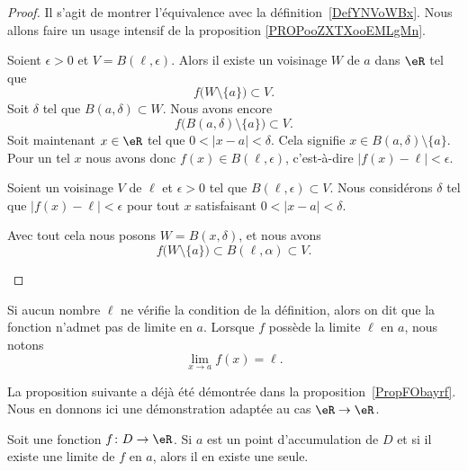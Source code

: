 \begin{proof}
	Il s'agit de montrer l'équivalence avec la définition~\ref{DefYNVoWBx}. Nous allons faire un usage intensif de la proposition \ref{PROPooZXTXooEMLgMn}.
	\begin{subproof}
		Soient \( \epsilon>0\) et \( V=B(\ell,\epsilon)\). Alors il existe un voisinage \( W\) de \( a\) dans \( \eR\) tel que
		\begin{equation}
			f\big( W\setminus\{ a \} \big)\subset V.
		\end{equation}
		Soit \( \delta\) tel que \( B(a,\delta)\subset W\). Nous avons encore
		\begin{equation}
			f\big( B(a,\delta)\setminus\{ a \} \big)\subset V.
		\end{equation}
		Soit maintenant \( x\in \eR\) tel que \( 0<| x-a |<\delta\). Cela signifie \( x\in B(a,\delta)\setminus\{ a \}\). Pour un tel \( x\) nous avons donc \( f(x)\in B(\ell,\epsilon)\), c'est-à-dire \( | f(x)-\ell |<\epsilon\).

		Soient un voisinage \( V\) de \( \ell\) et \( \epsilon>0\) tel que \( B(\ell,\epsilon)\subset V\). Nous considérons \( \delta\) tel que \( | f(x)-\ell |<\epsilon\) pour tout \( x\) satisfaisant \( 0<| x-a |<\delta\).

		Avec tout cela nous posons \( W=B(x,\delta)\), et nous avons
		\begin{equation}
			f\big( W\setminus\{ a \} \big)\subset B(\ell,\alpha)\subset V.
		\end{equation}
	\end{subproof}
\end{proof}

Si aucun nombre \( \ell\) ne vérifie la condition de la définition, alors on dit que la fonction n'admet pas de limite en \( a\). Lorsque \( f\) possède la limite \( \ell\) en \( a\), nous notons
\begin{equation}
	\lim_{x\to a} f(x)=\ell.
\end{equation}

La proposition suivante a déjà été démontrée dans la proposition~\ref{PropFObayrf}. Nous en donnons ici une démonstration adaptée au cas \( \eR\to \eR\).

\begin{proposition}
	Soit une fonction \( f\colon D\to \eR\). Si \( a\) est un point d'accumulation de \( D\) et si il existe une limite de \( f\) en \( a\), alors il en existe une seule.
\end{proposition}

